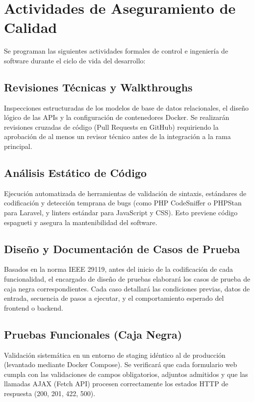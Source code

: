 \section{Actividades de Aseguramiento de Calidad}

Se programan las siguientes actividades formales de control e ingeniería de software durante el ciclo de vida del desarrollo:

\subsection{Revisiones Técnicas y Walkthroughs}
Inspecciones estructuradas de los modelos de base de datos relacionales, el diseño lógico de las APIs y la configuración de contenedores Docker. Se realizarán revisiones cruzadas de código (Pull Requests en GitHub) requiriendo la aprobación de al menos un revisor técnico antes de la integración a la rama principal.

\subsection{Análisis Estático de Código}
Ejecución automatizada de herramientas de validación de sintaxis, estándares de codificación y detección temprana de bugs (como PHP CodeSniffer o PHPStan para Laravel, y linters estándar para JavaScript y CSS). Esto previene código espagueti y asegura la mantenibilidad del software.

\subsection{Diseño y Documentación de Casos de Prueba}
Basados en la norma IEEE 29119, antes del inicio de la codificación de cada funcionalidad, el encargado de diseño de pruebas elaborará los casos de prueba de caja negra correspondientes. Cada caso detallará las condiciones previas, datos de entrada, secuencia de pasos a ejecutar, y el comportamiento esperado del frontend o backend.

\subsection{Pruebas Funcionales (Caja Negra)}
Validación sistemática en un entorno de staging idéntico al de producción (levantado mediante Docker Compose). Se verificará que cada formulario web cumpla con las validaciones de campos obligatorios, adjuntos admitidos y que las llamadas AJAX (Fetch API) procesen correctamente los estados HTTP de respuesta (200, 201, 422, 500).

